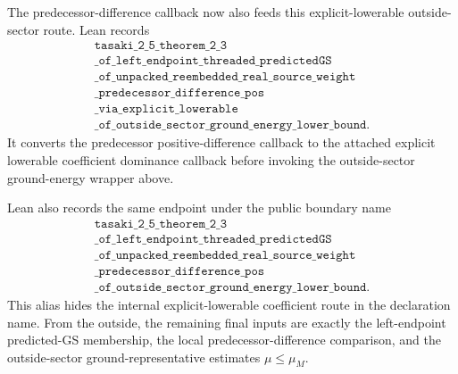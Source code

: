 \documentclass[a4paper,11pt]{article}
\begin{document}
The predecessor-difference callback now also feeds this
explicit-lowerable outside-sector route.  Lean records
\[
\begin{gathered}
\texttt{tasaki\_2\_5\_theorem\_2\_3}\\
\texttt{\_of\_left\_endpoint\_threaded\_predictedGS}\\
\texttt{\_of\_unpacked\_reembedded\_real\_source\_weight}\\
\texttt{\_predecessor\_difference\_pos}\\
\texttt{\_via\_explicit\_lowerable}\\
\texttt{\_of\_outside\_sector\_ground\_energy\_lower\_bound}.
\end{gathered}
\]
It converts the predecessor positive-difference callback to the attached
explicit lowerable coefficient dominance callback before invoking the
outside-sector ground-energy wrapper above.

Lean also records the same endpoint under the public boundary name
\[
\begin{gathered}
\texttt{tasaki\_2\_5\_theorem\_2\_3}\\
\texttt{\_of\_left\_endpoint\_threaded\_predictedGS}\\
\texttt{\_of\_unpacked\_reembedded\_real\_source\_weight}\\
\texttt{\_predecessor\_difference\_pos}\\
\texttt{\_of\_outside\_sector\_ground\_energy\_lower\_bound}.
\end{gathered}
\]
This alias hides the internal explicit-lowerable coefficient route in the declaration
name.  From the outside, the remaining final inputs are exactly the
left-endpoint predicted-GS membership, the local predecessor-difference
comparison, and the outside-sector ground-representative estimates
\(\mu\le\mu_M\).
\end{document}
